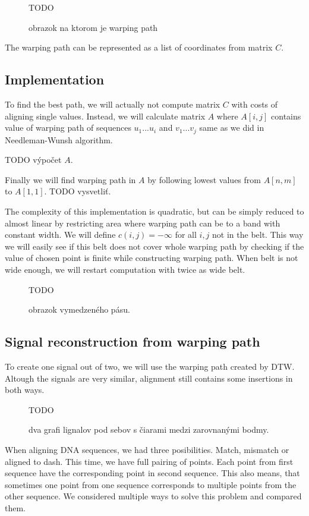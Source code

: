 \begin{figure}
  \centering
  TODO
  \caption{obrazok na ktorom je warping path}
\end{figure}

The warping path can be represented as a list of coordinates from matrix $C$.


\subsection{Implementation}
To find the best path, we will actually not compute matrix $C$ with costs of aligning single values.
Instead, we will calculate matrix $A$ where $A[i,j]$ contains value of warping path of sequences $u_1...u_i$ and $v_1...v_j$ same as we did in Needleman-Wunsh algorithm. 

TODO výpočet $A$.

Finally we will find warping path in $A$ by following lowest values from $A[n,m]$ to $A[1,1]$. 
TODO vysvetliť.

The complexity of this implementation is quadratic, but can be simply reduced to almost linear by restricting area where warping path can be to a band with constant width. We will define $c(i,j)=-\infty$ for all $i,j$ not in the belt. This way we will easily see if this belt does not cover whole warping path by checking if the value of chosen point is finite while constructing warping path. 
When belt is not wide enough, we will restart computation with twice as wide belt.
\begin{figure}
  \centering
  TODO
  \caption{obrazok vymedzeného pásu.}
\end{figure}


\subsection{Signal reconstruction from warping path}
To create one signal out of two, we will use the warping path created by DTW.
Altough the signals are very similar, alignment still contains some insertions in both ways. 

\begin{figure}
  \centering
  TODO
  \caption{dva grafi lignalov pod sebov s čiarami medzi zarovnanými bodmy.}
\end{figure}

When aligning DNA sequences, we had three posibilities. Match, mismatch or aligned to dash. 
This time, we have full pairing of points. Each point from first sequence have the corresponding point
in second sequence. This also means, that sometimes one point from one sequence corresponds to multiple 
points from the other sequence.
We considered multiple ways to solve this problem and compared them.

